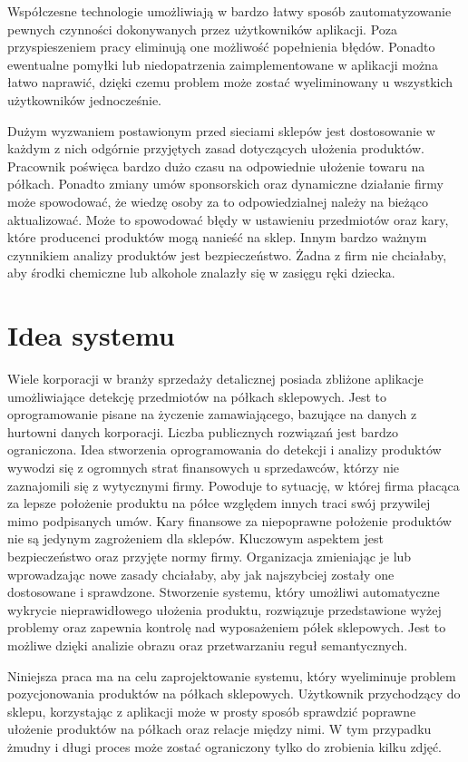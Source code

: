 Współczesne technologie umożliwiają w bardzo łatwy sposób zautomatyzowanie pewnych czynności dokonywanych przez użytkowników aplikacji. Poza przyspieszeniem pracy eliminują one możliwość popełnienia błędów. Ponadto ewentualne pomyłki lub niedopatrzenia zaimplementowane w aplikacji można łatwo naprawić, dzięki czemu problem może zostać wyeliminowany u wszystkich użytkowników jednocześnie. 

 Dużym wyzwaniem postawionym przed sieciami sklepów jest dostosowanie w każdym z nich odgórnie przyjętych zasad dotyczących ułożenia produktów. Pracownik poświęca bardzo dużo czasu na odpowiednie ułożenie towaru na półkach. Ponadto zmiany umów sponsorskich oraz dynamiczne działanie firmy może spowodować, że wiedzę osoby za to odpowiedzialnej należy na bieżąco aktualizować. Może to spowodować błędy w ustawieniu przedmiotów oraz kary, które producenci produktów mogą nanieść na sklep. Innym bardzo ważnym czynnikiem analizy produktów jest bezpieczeństwo. Żadna z firm nie chciałaby, aby środki chemiczne lub alkohole znalazły się w zasięgu ręki dziecka.

\section{Idea systemu}
Wiele korporacji w branży sprzedaży detalicznej posiada zbliżone aplikacje umożliwiające detekcję przedmiotów na półkach sklepowych. Jest to oprogramowanie pisane na życzenie zamawiającego, bazujące na danych z hurtowni danych korporacji. Liczba publicznych rozwiązań jest bardzo ograniczona. Idea stworzenia oprogramowania do detekcji i analizy produktów wywodzi się z ogromnych strat finansowych u sprzedawców, którzy nie zaznajomili się z wytycznymi firmy. Powoduje to sytuację, w której firma płacąca za lepsze położenie produktu na półce względem innych traci swój przywilej mimo podpisanych umów. Kary finansowe za niepoprawne położenie produktów nie są jedynym zagrożeniem dla sklepów. Kluczowym aspektem jest bezpieczeństwo oraz przyjęte normy firmy. Organizacja zmieniając je lub wprowadzając nowe zasady chciałaby, aby jak najszybciej zostały one dostosowane i sprawdzone. Stworzenie systemu, który umożliwi automatyczne wykrycie nieprawidłowego ułożenia produktu, rozwiązuje przedstawione wyżej 	problemy oraz zapewnia kontrolę nad wyposażeniem półek sklepowych. Jest to możliwe dzięki analizie obrazu oraz przetwarzaniu reguł semantycznych.

Niniejsza praca ma na celu zaprojektowanie systemu, który wyeliminuje problem pozycjonowania produktów na półkach sklepowych. Użytkownik przychodzący do sklepu, korzystając z aplikacji może w prosty sposób sprawdzić poprawne ułożenie produktów na półkach oraz relacje między nimi. W tym przypadku żmudny i długi proces może zostać ograniczony tylko do zrobienia kilku zdjęć. 

